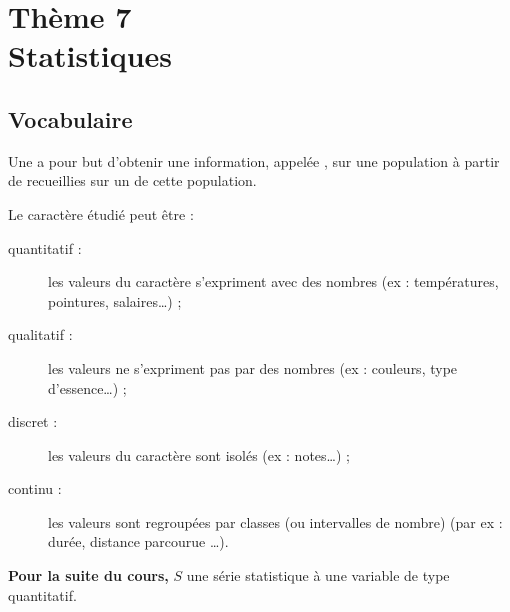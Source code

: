 \documentclass[french,12pt]{report}
\begin{document}
\ReglePied





\chapter{Thème 7 \\ Statistiques}
\thispagestyle{garde}


\bigskip

\section{Vocabulaire}
\begin{Defi}[s]{}
    Une  a pour but d'obtenir une information, appelée , sur une population à partir de  recueillies sur un  de cette population.

    Le caractère étudié peut être :
        \begin{description}
            \item[quantitatif :] les valeurs du caractère s'expriment avec des nombres (ex : températures, pointures, salaires\ldots) ;
            \item[qualitatif :] les valeurs ne s'expriment pas par des nombres (ex : couleurs, type d'essence\ldots) ;
            \item[discret :] les valeurs du caractère sont isolés (ex : notes\ldots) ;
            \item[continu :] les valeurs sont regroupées par classes (ou intervalles de nombre) (par ex : durée, distance parcourue \ldots).
        \end{description}
\end{Defi}

\textbf{Pour la suite du cours,} $S$ une série statistique à une variable de type quantitatif.
\end{document}
